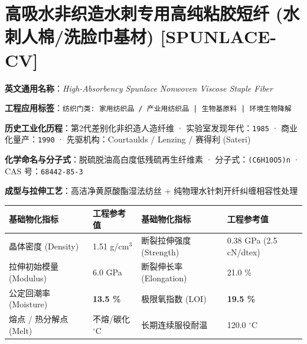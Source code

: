 \documentclass[11pt,openright,twoside,UTF8]{ctexbook}
\begin{document}
\section{高吸水非织造水刺专用高纯粘胶短纤 (水刺人棉/洗脸巾基材) [SPUNLACE-CV]}
\label{sec:spunlace-cv}

\noindent\textbf{英文通用名称}：\textit{High-Absorbency Spunlace Nonwoven Viscose Staple Fiber}\par
\noindent\textbf{工程应用标签}：\texttt{纺织门类: 家用纺织品 / 产业用纺织品 | 生物基原料 | 环境生物降解}\par
\noindent\textbf{历史工业化历程}：第2代差别化非织造人造纤维 · 实验室发现年代：\texttt{1985} · 商业化量产：\texttt{1990} · 先驱机构：Courtaulds / Lenzing / 赛得利 (Sateri)\par
\noindent\textbf{化学命名与分子式}：脱硫脱油高白度低残硫再生纤维素 · 分子式：\texttt{(C6H10O5)n} · CAS 号：\texttt{68442-85-3}\par
\noindent\textbf{成型与拉伸工艺}：高洁净黄原酸酯湿法纺丝 + 纯物理水针刺开纤纠缠相容性处理\par

\vspace{0.15cm}
\begin{center}
\small
\begin{tabularx}{\textwidth}{p{3.8cm}Xp{3.8cm}X}
\toprule
\textbf{基础物化指标} & \textbf{工程参考值} & \textbf{基础物化指标} & \textbf{工程参考值} \\
\midrule
晶体密度 (Density) & 1.51 g/cm$^3$ & 断裂拉伸强度 (Strength) & 0.38 GPa (2.5 cN/dtex) \\
拉伸初始模量 (Modulus) & 6.0 GPa & 断裂伸长率 (Elongation) & 21.0 \% \\
公定回潮率 (Moisture) & \textbf{13.5 \%} & 极限氧指数 (LOI) & \textbf{19.5 \%} \\
熔点 / 热分解点 (Melt) & 不熔/碳化 $^\circ\mathrm{C}$ & 长期连续服役耐温 & 120.0 $^\circ\mathrm{C}$ \\
\bottomrule
\end{tabularx}
\end{center}
\vspace{0.15cm}
\end{document}
